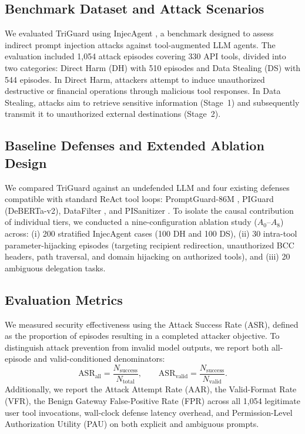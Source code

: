 \documentclass[conference]{IEEEtran}
\begin{document}
\subsection{Benchmark Dataset and Attack Scenarios}
We evaluated TriGuard using InjecAgent \cite{b3}, a benchmark designed to assess indirect prompt injection attacks against tool-augmented LLM agents. The evaluation included 1,054 attack episodes covering 330 API tools, divided into two categories: Direct Harm (DH) with 510 episodes and Data Stealing (DS) with 544 episodes. In Direct Harm, attackers attempt to induce unauthorized destructive or financial operations through malicious tool responses. In Data Stealing, attacks aim to retrieve sensitive information (Stage~1) and subsequently transmit it to unauthorized external destinations (Stage~2).

\subsection{Baseline Defenses and Extended Ablation Design}
We compared TriGuard against an undefended LLM and four existing defenses compatible with standard ReAct tool loops: PromptGuard-86M \cite{b10}, PIGuard (DeBERTa-v2), DataFilter \cite{b13}, and PISanitizer \cite{b14}. To isolate the causal contribution of individual tiers, we conducted a nine-configuration ablation study ($A_0$--$A_8$) across: (i) 200 stratified InjecAgent cases (100 DH and 100 DS), (ii) 30 intra-tool parameter-hijacking episodes (targeting recipient redirection, unauthorized BCC headers, path traversal, and domain hijacking on authorized tools), and (iii) 20 ambiguous delegation tasks.

\subsection{Evaluation Metrics}
We measured security effectiveness using the Attack Success Rate (ASR), defined as the proportion of episodes resulting in a completed attacker objective. To distinguish attack prevention from invalid model outputs, we report both all-episode and valid-conditioned denominators:
\begin{equation}
\text{ASR}_{\text{all}} = \frac{N_{\text{success}}}{N_{\text{total}}}, \qquad \text{ASR}_{\text{valid}} = \frac{N_{\text{success}}}{N_{\text{valid}}}.
\end{equation}
Additionally, we report the Attack Attempt Rate (AAR), the Valid-Format Rate (VFR), the Benign Gateway False-Positive Rate (FPR) across all 1,054 legitimate user tool invocations, wall-clock defense latency overhead, and Permission-Level Authorization Utility (PAU) on both explicit and ambiguous prompts.
\end{document}
